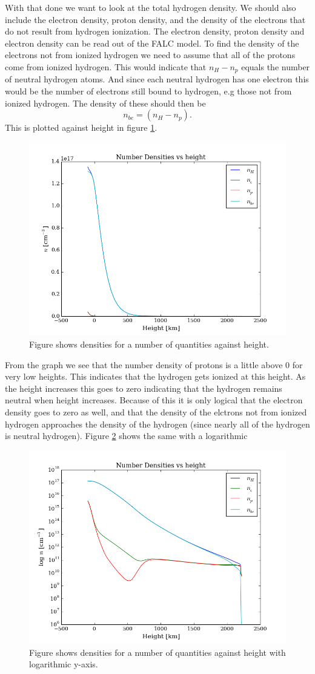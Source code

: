 \documentclass{aa}   %
\begin{document}
With that done we want to look at the total hydrogen density. We should also include the electron density, proton density, and the density of the electrons that do not result from hydrogen ionization. The electron density, proton density and electron density can be read out of the FALC model. To find the density of the electrons not from ionized hydrogen we need to assume that all of the protons come from ionized hydrogen. This would indicate that $n_H - n_p$ equals the number of neutral hydrogen atoms. And since each neutral hydrogen has one electron this would be the number of electrons still bound to hydrogen, e.g those not from ionized hydrogen. The density of these should then be
\begin{equation}
 n_{be} = (n_H - n_p).
\end{equation}
This is plotted against height in figure \ref{densities_height}. 
\begin{figure}
 \includegraphics[width=.49\textwidth]{densities_height.png}
 \caption{Figure shows densities for a number of quantities against height.}
 \label{densities_height} 
\end{figure}

From the graph we see that the number density of protons is a little above 0 for very low heights. This indicates that the hydrogen gets ionized at this height. As the height increases this goes to zero indicating that the hydrogen remains neutral when height increases. Because of this it is only logical that the electron density goes to zero as well, and that the density of the elctrons not from ionized hydrogen approaches the density of the hydrogen (since nearly all of the hydrogen is neutral hydrogen). Figure \ref{densities_height_log} shows the same with a logarithmic
\begin{figure}
 \includegraphics[width=.49\textwidth]{densities_height_log.png}
 \caption{Figure shows densities for a number of quantities against height with logarithmic y-axis.}
 \label{densities_height_log} 
\end{figure}
\end{document}
